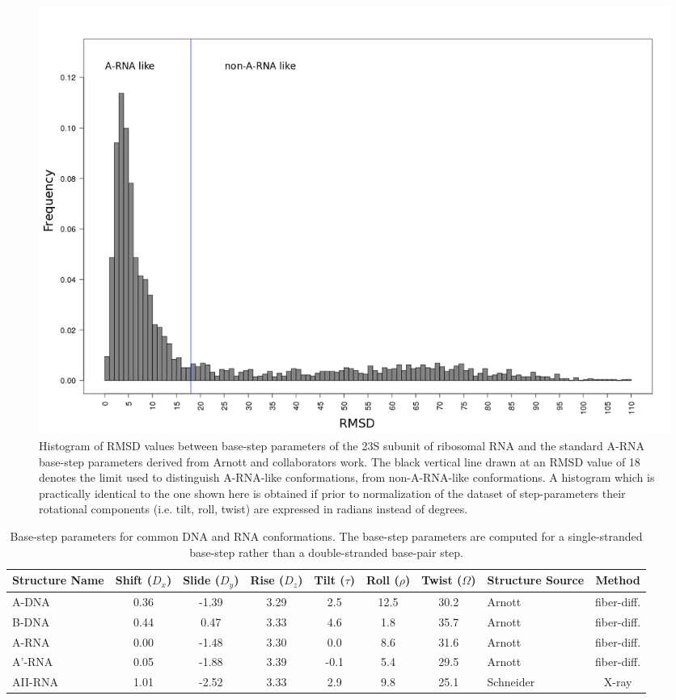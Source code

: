 \begin{figure}[ht]
 \centering
\includegraphics[angle=0, scale=0.38]{Chapter2/dormsd.png}
\caption{Histogram of RMSD values  between base-step parameters of the
23S  subunit  of  ribosomal  RNA  and  the  standard  A-RNA  base-step
parameters  derived from  Arnott  and collaborators  \cite{arnott1973}
work. The black vertical line drawn at an RMSD value of 18 denotes the
limit   used    to   distinguish   A-RNA-like    conformations,   from
non-A-RNA-like  conformations.   A   histogram  which  is  practically
identical to the one shown  here is obtained if prior to normalization
of  the   dataset  of  step-parameters   their  rotational  components
(i.e. tilt, roll, twist) are expressed in radians instead of degrees.}
\label{fig:dormsd}
\end{figure}

\begin{table}[ht]
\centering
\small\addtolength{\tabcolsep}{-2pt}
\begin{tabular}{p{1.4cm}|c|c|c|c|c|c|p{2.2cm}|c}
\hline
\textbf{Structure Name} & Shift ($D_x$) & Slide ($D_y$) & Rise ($D_z$) & Tilt
($\tau$) & Roll ($\rho$) & Twist ($\Omega$) & \textbf{Structure Source} &
\textbf{Method} \\ \hline
A-DNA & 0.36 & -1.39 & 3.29 & 2.5 & 12.5 & 30.2 & Arnott
\cite{arnott1999} & fiber-diff. \\ \hline
B-DNA & 0.44 & 0.47 & 3.33 & 4.6 & 1.8 & 35.7   & Arnott
\cite{arnott1999} & fiber-diff. \\ \hline
A-RNA & 0.00 & -1.48 & 3.30 & 0.0 & 8.6 & 31.6 & Arnott
\cite{arnott1999} & fiber-diff. \\ \hline
A'-RNA & 0.05 & -1.88 & 3.39 & -0.1 & 5.4 & 29.5 & Arnott
\cite{arnott1999} & fiber-diff. \\ \hline
AII-RNA & 1.01 & -2.52 & 3.33 & 2.9 & 9.8 & 25.1 & Schneider
\cite{schneider2004} & X-ray \\ \hline
\end{tabular}
\caption{Base-step   parameters    for   common    DNA    and   RNA
  conformations.   The  base-step  parameters   are  computed   for  a
  single-stranded  base-step rather  than a  double-stranded base-pair
  step.}
\label{tab:conf}
\end{table}

